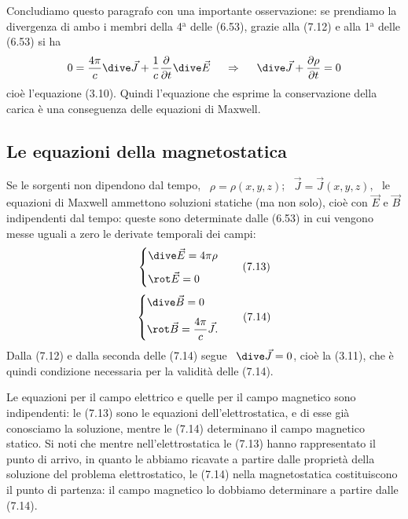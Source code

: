 Concludiamo questo paragrafo con una importante osservazione: se prendiamo la
divergenza di ambo i membri della 4$^\mathrm{a}$ delle (6.53), grazie alla
(7.12) e alla 1$^\mathrm{a}$ delle (6.53) si ha
\[
  0=\frac{4\pi}{c}\dive\vec J+\frac{1}{c}\frac{\partial}{\partial t}\dive\vec E
  \quad\ \Rightarrow\quad\ \dive\vec J+\frac{\partial\rho}{\partial t}=0
\]
cio\`e l'equazione (3.10). Quindi l'equazione che esprime la conservazione della
carica \`e una conseguenza delle equazioni di Maxwell.

\subsection{Le equazioni della magnetostatica}

Se le sorgenti non dipendono dal tempo, \ $\rho=\rho(x,y,z)$;
\ $\vec J=\vec J(x,y,z)$, \ le equazioni di Maxwell ammettono soluzioni statiche
(ma non solo), cio\`e con $\vec E$ e $\vec B$ indipendenti dal tempo: queste
sono determinate dalle (6.53) in cui vengono messe uguali a zero le derivate
temporali dei campi:
\begin{equation}
  \left\{\begin{aligned}
    &\dive\vec E=4\pi\rho\\[4pt]
    &\rot\vec E=0
  \end{aligned}\right.
  \tag{7.13}
\end{equation}
\begin{equation}
  \left\{\begin{aligned}
    &\dive\vec B=0\\[4pt]
    &\rot\vec B=\frac{4\pi}{c}\vec J.
  \end{aligned}\right.
  \tag{7.14}
\end{equation}
Dalla (7.12) e dalla seconda delle (7.14) segue \ $\dive\vec J=0$, cio\`e la
(3.11), che \`e quindi condizione necessaria per la validit\`a delle (7.14).

Le equazioni per il campo elettrico e quelle per il campo magnetico sono
indipendenti: le (7.13) sono le equazioni dell'elettrostatica, e di esse gi\`a
conosciamo la soluzione, mentre le (7.14) determinano il campo magnetico
statico. Si noti che mentre nell'elettrostatica le (7.13) hanno rappresentato il
punto di arrivo, in quanto le abbiamo ricavate a partire dalle propriet\`a della
soluzione del problema elettrostatico, le (7.14) nella magnetostatica
costituiscono il punto di partenza: il campo magnetico lo dobbiamo determinare a
partire dalle (7.14).

